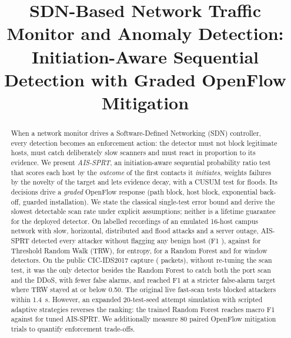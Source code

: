 \documentclass[conference]{IEEEtran}
\begin{document}
\title{SDN-Based Network Traffic Monitor and Anomaly Detection:\\ Initiation-Aware Sequential Detection with Graded OpenFlow Mitigation}

\author{
\and
{}
\and
{}
\and
{}
\and
{}
\and
{}
\and
{}
}

\maketitle

\begin{abstract}
When a network monitor drives a Software-Defined Networking (SDN) controller, every detection becomes an enforcement
action: the detector must not block legitimate hosts, must catch deliberately slow scanners and must react in proportion
to its evidence. We present \emph{AIS-SPRT}, an initiation-aware sequential probability ratio test that scores each host by
the \emph{outcome} of the first contacts it \emph{initiates}, weights failures by the novelty of the target and lets evidence
decay, with a CUSUM test for floods. Its decisions drive a \emph{graded} OpenFlow response (path block, host block,
exponential back-off, guarded installation). We state the classical single-test error bound and derive the slowest
detectable scan rate under explicit assumptions; neither is a lifetime guarantee for the deployed detector.
On \NRuns{} labelled recordings of an emulated 16-host campus network with slow, horizontal, distributed and flood attacks
and a server outage, AIS-SPRT detected every attacker without flagging any benign host (F1 \OursFone{}), against
\TRWFone{} for Threshold Random Walk (TRW), \EntFone{} for entropy, \RFFone{} for a Random Forest and \IAFone{} for window
detectors. On the public CIC-IDS2017 capture (\cicPackets{} packets), without re-tuning the scan test, it was the only
detector besides the Random Forest to catch both the port scan and the DDoS, with fewer false alarms, and reached F1
\swCicBFone{} at a stricter false-alarm target where TRW stayed at or below 0.50. The original live fast-scan tests
blocked attackers within 1.4~s. However, an expanded 20-test-seed attempt simulation with scripted adaptive strategies
reverses the ranking: the trained Random Forest reaches macro F1 \ResearchRFFone{} against \ResearchAISFone{} for tuned
AIS-SPRT. We additionally measure 80 paired OpenFlow mitigation trials to quantify enforcement trade-offs.
\end{abstract}
\end{document}
